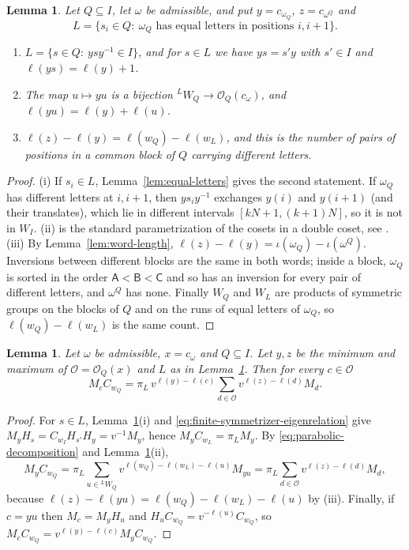 \documentclass[11pt,a4paper,reqno]{amsart}
\numberwithin{equation}{section}
\newtheorem{lemma}[theorem]{Lemma}
\theoremstyle{definition}
\theoremstyle{remark}
\theoremstyle{plain}
\newcommand{\A}{\mathsf A}
\newcommand{\B}{\mathsf B}
\newcommand{\CC}{\mathsf C}
\begin{document}
\begin{lemma}\label{lem:parabolic-double-cosets}
Let $Q\subseteq I$, let $\omega$ be admissible, and put $y=c_{\omega_Q}$, $z=c_{\omega^Q}$ and
\[
 L=\{s_i\in Q:\ \omega_Q\text{ has equal letters in positions }i,i+1\}.
\]
\begin{enumerate}[label=\textup{(\roman*)}]
\item $L=\{s\in Q:\ ysy^{-1}\in I\}$, and for $s\in L$ we have $ys=s'y$ with $s'\in I$ and $\ell(ys)=\ell(y)+1$.
\item The map $u\mapsto yu$ is a bijection ${}^LW_Q\to\mathcal O_Q(c_\omega)$, and $\ell(yu)=\ell(y)+\ell(u)$.
\item $\ell(z)-\ell(y)=\ell(w_Q)-\ell(w_L)$, and this is the number of pairs of positions in a common block of $Q$
carrying different letters.
\end{enumerate}
\end{lemma}
\begin{proof}
(i) If $s_i\in L$, Lemma~\ref{lem:equal-letters} gives the second statement. If $\omega_Q$ has different letters at
$i,i+1$, then $ys_iy^{-1}$ exchanges $y(i)$ and $y(i+1)$ (and their translates), which lie in different intervals
$[kN+1,(k+1)N]$, so it is not in $W_I$.
(ii) is the standard parametrization of the cosets in a double coset, see \cite[Lemmas~2.12 and~2.14]{EK}.
(iii) By Lemma~\ref{lem:word-length}, $\ell(z)-\ell(y)=\iota(\omega_Q)-\iota(\omega^Q)$. Inversions between different
blocks are the same in both words; inside a block, $\omega_Q$ is sorted in the order $\A<\B<\CC$ and so has an inversion
for every pair of different letters, and $\omega^Q$ has none. Finally $W_Q$ and $W_L$ are products of symmetric groups on the blocks of $Q$
and on the runs of equal letters of $\omega_Q$, so $\ell(w_Q)-\ell(w_L)$ is the same count.
\end{proof}

\begin{lemma}\label{lem:averaging}
Let $\omega$ be admissible, $x=c_\omega$ and $Q\subseteq I$. Let $y,z$ be the minimum and maximum of
$\mathcal O=\mathcal O_Q(x)$ and $L$ as in Lemma~\ref{lem:parabolic-double-cosets}. Then for every $c\in\mathcal O$
\begin{equation}\label{eq:double-coset-averaging}
 M_cC_{w_Q}=\pi_L\,v^{\ell(y)-\ell(c)}\sum_{d\in\mathcal O}v^{\ell(z)-\ell(d)}M_d .
\end{equation}
\end{lemma}
\begin{proof}
For $s\in L$, Lemma~\ref{lem:parabolic-double-cosets}(i) and \eqref{eq:finite-symmetrizer-eigenrelation} give
$M_yH_s=C_{w_I}H_{s'}H_y=v^{-1}M_y$, hence $M_yC_{w_L}=\pi_LM_y$.
By \eqref{eq:parabolic-decomposition} and Lemma~\ref{lem:parabolic-double-cosets}(ii),
\[
 M_yC_{w_Q}=\pi_L\sum_{u\in{}^LW_Q}v^{\ell(w_Q)-\ell(w_L)-\ell(u)}M_{yu}
 =\pi_L\sum_{d\in\mathcal O}v^{\ell(z)-\ell(d)}M_d,
\]
because $\ell(z)-\ell(yu)=\ell(w_Q)-\ell(w_L)-\ell(u)$ by (iii). Finally, if $c=yu$ then $M_c=M_yH_u$ and
$H_uC_{w_Q}=v^{-\ell(u)}C_{w_Q}$, so $M_cC_{w_Q}=v^{\ell(y)-\ell(c)}M_yC_{w_Q}$.
\end{proof}
\end{document}
